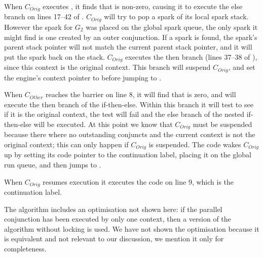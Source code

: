 \begin{description}
    When $C_{Orig}$ executes \joinandcontinue,
    it finds that  is non-zero,
    causing it to execute the else branch on lines 17--42 of \joinandcontinue.
    $C_{Orig}$ will try to pop a spark of its local spark stack.
    However the spark for $G_2$ was placed on the global
    spark queue,
    the only spark it might find is one created by an outer conjunction.
    If a spark is found, the spark's parent stack pointer will not match the
    current parent stack pointer,
    and it will put the spark back on the stack.
    $C_{Orig}$ executes the then branch (lines 37--38 of \joinandcontinue),
    since this context is the original context.
    This branch will suspend $C_{Orig}$,
    and set the engine's context pointer to \NULL
    before jumping to \idle.

    When $C_{Other}$ reaches the barrier on line 8,
    it will find that  is zero,
    and will execute the then branch of the if-then-else.
    Within this branch it will test to see if it is the original
    context,
    the test will fail and the else branch of the nested if-then-else
    will be executed.
    At this point we know that $C_{Orig}$ must be suspended because
    there where no outstanding conjuncts and the current context is not
    the original context;
    this can only happen if $C_{Orig}$ is suspended.
    The code wakes $C_{Orig}$ up by
    setting its code pointer to the continuation label,
    placing it on the global run queue,
    and then jumps to \idle.

    When $C_{Orig}$ resumes execution it executes the code on line 9,
    which is the continuation label.

\end{description}

The algorithm includes an optimisation not shown here:
if the parallel conjunction has been executed by only one context,
then a version of the algorithm without locking is used.
We have not shown the optimisation because it is equivalent and not relevant
to our discussion,
we mention it only for completeness.

